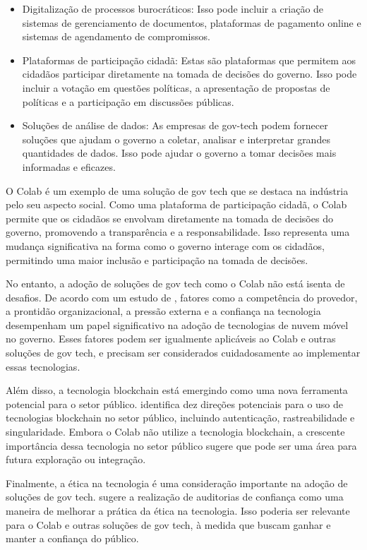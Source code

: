 \begin{itemize}
	\item Digitalização de processos burocráticos: Isso pode incluir a criação de sistemas de gerenciamento de documentos, plataformas de pagamento online e sistemas de agendamento de compromissos.
	\item Plataformas de participação cidadã: Estas são plataformas que permitem aos cidadãos participar diretamente na tomada de decisões do governo. Isso pode incluir a votação em questões políticas, a apresentação de propostas de políticas e a participação em discussões públicas.
	\item Soluções de análise de dados: As empresas de gov-tech podem fornecer soluções que ajudam o governo a coletar, analisar e interpretar grandes quantidades de dados. Isso pode ajudar o governo a tomar decisões mais informadas e eficazes.
\end{itemize}

O Colab é um exemplo de uma solução de gov tech que se destaca na indústria pelo seu aspecto social. Como uma plataforma de participação cidadã, o Colab permite que os cidadãos se envolvam diretamente na tomada de decisões do governo, promovendo a transparência e a responsabilidade. Isso representa uma mudança significativa na forma como o governo interage com os cidadãos, permitindo uma maior inclusão e participação na tomada de decisões.

No entanto, a adoção de soluções de gov tech como o Colab não está isenta de desafios. De acordo com um estudo de , fatores como a competência do provedor, a prontidão organizacional, a pressão externa e a confiança na tecnologia desempenham um papel significativo na adoção de tecnologias de nuvem móvel no governo. Esses fatores podem ser igualmente aplicáveis ao Colab e outras soluções de gov tech, e precisam ser considerados cuidadosamente ao implementar essas tecnologias.

Além disso, a tecnologia blockchain está emergindo como uma nova ferramenta potencial para o setor público.  identifica dez direções potenciais para o uso de tecnologias blockchain no setor público, incluindo autenticação, rastreabilidade e singularidade. Embora o Colab não utilize a tecnologia blockchain, a crescente importância dessa tecnologia no setor público sugere que pode ser uma área para futura exploração ou integração.

Finalmente, a ética na tecnologia é uma consideração importante na adoção de soluções de gov tech.  sugere a realização de auditorias de confiança como uma maneira de melhorar a prática da ética na tecnologia. Isso poderia ser relevante para o Colab e outras soluções de gov tech, à medida que buscam ganhar e manter a confiança do público.

